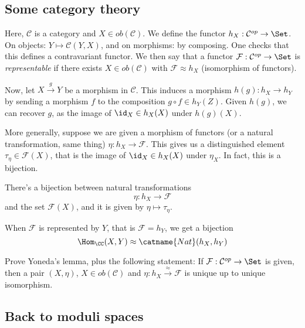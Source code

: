 \documentclass[11pt, english]{article}
\begin{document}
\subsection{Some category theory}

Here, $\mathcal C$ is a category and $X \in ob(\mathcal C)$. We define the functor $h_X: \mathcal C^{op} \to \Set$. On objects: $Y \mapsto \mathcal C (Y,X)$, and on morphisms: by composing. One checks that this defines a contravariant functor. We then say that a functor $\mathcal F:\mathcal C^{op} \to \Set$ is \emph{representable} if there exists $X \in ob(\mathcal C)$ with $\mathcal F \approx h_X$ (isomorphism of functors).

Now, let $X \xrightarrow{g} Y$ be a morphism in $\mathcal C$. This induces a morphism $h(g):h_X \to h_Y$ by sending a morphism $f$ to the composition $g \circ f \in h_Y(Z)$. Given $h(g)$, we can recover $g$, as the image of $\id_X \in h_X(X)$ under $h(g)(X)$.

More generally, suppose we are given a morphism of functors (or a natural transformation, same thing) $\eta:h_X \to \mathcal F$. This gives us a distinguished element $\tau_\eta \in \mathcal F (X)$, that is the image of $\id_X \in h_X(X)$ under $\eta_X$. In fact, this is a bijection.

\begin{lemma}
There's a bijection between natural transformations
\[
\eta: h_X \to \mathcal F
\]
and the set $\mathcal{F}(X)$, and it is given by $\eta \mapsto \tau_\eta$.
\end{lemma}

\begin{example}
When $\mathcal F$ is represented by $Y$, that is $\mathcal F = h_Y$, we get a bijection
\[
\Hom_\CC (X,Y) \approx \catname{Nat}(h_X,h_Y) 
\]
\end{example}

\begin{exc}
Prove Yoneda's lemma, plus the following statement: If $\mathcal F : \mathcal C^{op} \to \Set$ is given, then a pair $(X,\eta)$, $X \in ob(\mathcal C)$ and $\eta:h_X \xrightarrow{\approx} \mathcal F$ is unique up to unique isomorphism.
\end{exc}
\begin{sol}

\end{sol}

\subsection{Back to moduli spaces}
\end{document}
